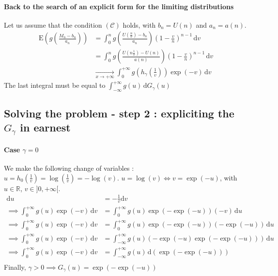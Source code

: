 \paragraph{Back to the search of an explicit form for the limiting distributions} Let us assume that the condition $(\mathcal{C})$ holds, with $b_n = U(n)$ and $a_n = a(n)$.
\begin{equation}
\begin{alignat*}{2}
\mathrm{E}(g(\frac{M_n - b_n}{a_n})) &= \int_0^n \! g(\frac{U(\frac{n}{v}) - b_n}{a_n}) (1 - \frac{v}{n})^{n - 1}\, \mathrm{d}v \\
&= \int_0^n \! g(\frac{U(n \frac{1}{v}) - U(n)}{a(n)}) (1 - \frac{v}{n})^{n - 1}\, \mathrm{d}v \\
&\xrightarrow[x \rightarrow + \infty]{} \int_0^{+ \infty} \! g(h_\gamma(\frac{1}{v})) \exp(- v)\, \mathrm{d}v
\end{alignat*}
\end{equation}The last integral must be equal to $\int_{- \infty}^{+ \infty} \! g(u) \, \mathrm{d}G_\gamma(u)$

\subsection{Solving the problem - step 2 : expliciting the $G_\gamma$ in earnest}
\paragraph{Case $\gamma = 0$} We make the following change of variables : $u = h_0(\frac{1}{v}) = \log(\frac{1}{v}) = - \log(v)$. \newline
$u = \log(v) \iff v = \exp(-u)$, with $u \in \mathbb{R}$, $v \in ]0,+ \infty[$.
\begin{equation}
\begin{alignat*}{2}
\mathrm{d}u &= - \frac{1}{v} \mathrm{d}v \\
\implies \int_0^{+ \infty} \! g(u) \exp(- v)\, \mathrm{d}v &= \int_0^{+ \infty} \! g(u) \exp(- \exp(- u)) (- v)\, \mathrm{d}u \\
\implies \int_0^{+ \infty} \! g(u) \exp(- v)\, \mathrm{d}v &= \int_0^{+ \infty} \! g(u) \exp(- \exp(- u)) (- \exp(- u))\, \mathrm{d}u \\
\implies \int_0^{+ \infty} \! g(u) \exp(- v)\, \mathrm{d}v &= \int_{- \infty}^{+ \infty} \! g(u) ( - \exp(- u)\exp(- \exp(- u))) \, \mathrm{d}u \\
\implies \int_0^{+ \infty} \! g(u) \exp(- v)\, \mathrm{d}v &= \int_{- \infty}^{+ \infty} \! g(u) \, \mathrm{d}(\exp(- \exp(- u))) \\
\end{alignat*}
\end{equation}
Finally, \underline{$\gamma > 0 \implies G_\gamma(u) = \exp(- \exp(- u)) $}

